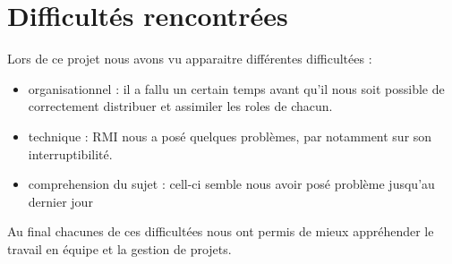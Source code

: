\section{Difficultés rencontrées}
Lors de ce projet nous avons vu apparaitre différentes difficultées : 
\begin{itemize}
 \item organisationnel : il a fallu un certain temps avant qu'il nous soit possible de correctement distribuer et assimiler les roles de chacun.
 \item technique : RMI nous a posé quelques problèmes, par notamment sur son interruptibilité.
 \item comprehension du sujet : cell-ci semble nous avoir posé problème jusqu'au dernier jour
\end{itemize}


Au final chacunes de ces difficultées nous ont permis de mieux appréhender le travail en équipe et la gestion de projets.